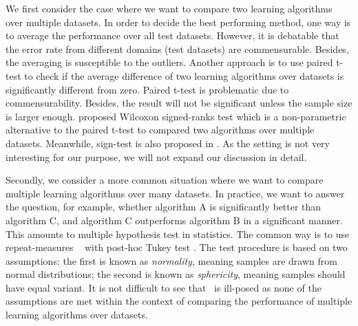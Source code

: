 {We first consider the case where we want to compare two learning algorithms over multiple datasets.
In order to decide the best performing method, one way is to average the performance over all test datasets.
However, it is debatable that the error rate from different domains (test datasets) are commensurable.
Besides, the averaging is susceptible to the outliers.
Another approach is to use paired t-test to check if the average difference of two learning algorithms over datasets is significantly different from zero.
Paired t-test is problematic due to commensurability.
Besides, the result will not be significant unless the sample size is larger enough.
\citet{Demsar06statistical} proposed Wilcoxon signed-ranks test which is a non-parametric alternative to the paired t-test to compared two algorithms over multiple datasets.
Meanwhile, sign-test is also proposed in \citep{Demsar06statistical}.
As the setting is not very interesting for our purpose, we will not expand our discussion in detail.

Secondly, we consider a more common situation where we want to compare multiple learning algorithms over many datasets.
In practice, we want to answer the question, for example, whether algorithm A is significantly better than algorithm C, and algorithm C outperforms algorithm B in a significant manner.
This amounts to multiple hypothesis test in statistics.
The common way is to use repeat-measures \anova\ \citep{Fisher59statistical} with post-hoc Tukey test \citep{Turkey49comparing}. 
The test procedure is based on two assumptions: the first is known as \textit{normality}, meaning samples are drawn from normal distributions; the second is known as \textit{sphericity}, meaning samples should have equal variant.
It is not difficult to see that \anova\ is ill-posed as none of the assumptions are met within the context of comparing the performance of multiple learning algorithms over datasets.

}
